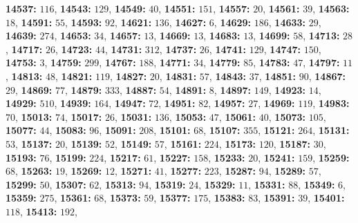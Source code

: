 \textsf{\bfseries 14537:} $116$, \textsf{\bfseries 14543:} $129$, \textsf{\bfseries 14549:} $40$, \textsf{\bfseries 14551:} $151$, \textsf{\bfseries 14557:} $20$, \textsf{\bfseries 14561:} $39$, \textsf{\bfseries 14563:} $18$, \textsf{\bfseries 14591:} $55$, \textsf{\bfseries 14593:} $92$, \textsf{\bfseries 14621:} $136$, \textsf{\bfseries 14627:} $6$, \textsf{\bfseries 14629:} $186$, \textsf{\bfseries 14633:} $29$, \textsf{\bfseries 14639:} $274$, \textsf{\bfseries 14653:} $34$, \textsf{\bfseries 14657:} $13$, \textsf{\bfseries 14669:} $13$, \textsf{\bfseries 14683:} $13$, \textsf{\bfseries 14699:} $58$, \textsf{\bfseries 14713:} $28$, \textsf{\bfseries 14717:} $26$, \textsf{\bfseries 14723:} $44$, \textsf{\bfseries 14731:} $312$, \textsf{\bfseries 14737:} $26$, \textsf{\bfseries 14741:} $129$, \textsf{\bfseries 14747:} $150$, \textsf{\bfseries 14753:} $3$, \textsf{\bfseries 14759:} $299$, \textsf{\bfseries 14767:} $188$, \textsf{\bfseries 14771:} $34$, \textsf{\bfseries 14779:} $85$, \textsf{\bfseries 14783:} $47$, \textsf{\bfseries 14797:} $11$, \textsf{\bfseries 14813:} $48$, \textsf{\bfseries 14821:} $119$, \textsf{\bfseries 14827:} $20$, \textsf{\bfseries 14831:} $57$, \textsf{\bfseries 14843:} $37$, \textsf{\bfseries 14851:} $90$, \textsf{\bfseries 14867:} $29$, \textsf{\bfseries 14869:} $77$, \textsf{\bfseries 14879:} $333$, \textsf{\bfseries 14887:} $54$, \textsf{\bfseries 14891:} $8$, \textsf{\bfseries 14897:} $149$, \textsf{\bfseries 14923:} $14$, \textsf{\bfseries 14929:} $510$, \textsf{\bfseries 14939:} $164$, \textsf{\bfseries 14947:} $72$, \textsf{\bfseries 14951:} $82$, \textsf{\bfseries 14957:} $27$, \textsf{\bfseries 14969:} $119$, \textsf{\bfseries 14983:} $70$, \textsf{\bfseries 15013:} $74$, \textsf{\bfseries 15017:} $26$, \textsf{\bfseries 15031:} $136$, \textsf{\bfseries 15053:} $47$, \textsf{\bfseries 15061:} $40$, \textsf{\bfseries 15073:} $105$, \textsf{\bfseries 15077:} $44$, \textsf{\bfseries 15083:} $96$, \textsf{\bfseries 15091:} $208$, \textsf{\bfseries 15101:} $68$, \textsf{\bfseries 15107:} $355$, \textsf{\bfseries 15121:} $264$, \textsf{\bfseries 15131:} $53$, \textsf{\bfseries 15137:} $20$, \textsf{\bfseries 15139:} $52$, \textsf{\bfseries 15149:} $57$, \textsf{\bfseries 15161:} $224$, \textsf{\bfseries 15173:} $120$, \textsf{\bfseries 15187:} $30$, \textsf{\bfseries 15193:} $76$, \textsf{\bfseries 15199:} $224$, \textsf{\bfseries 15217:} $61$, \textsf{\bfseries 15227:} $158$, \textsf{\bfseries 15233:} $20$, \textsf{\bfseries 15241:} $159$, \textsf{\bfseries 15259:} $68$, \textsf{\bfseries 15263:} $19$, \textsf{\bfseries 15269:} $12$, \textsf{\bfseries 15271:} $41$, \textsf{\bfseries 15277:} $223$, \textsf{\bfseries 15287:} $94$, \textsf{\bfseries 15289:} $57$, \textsf{\bfseries 15299:} $50$, \textsf{\bfseries 15307:} $62$, \textsf{\bfseries 15313:} $94$, \textsf{\bfseries 15319:} $24$, \textsf{\bfseries 15329:} $11$, \textsf{\bfseries 15331:} $88$, \textsf{\bfseries 15349:} $6$, \textsf{\bfseries 15359:} $275$, \textsf{\bfseries 15361:} $68$, \textsf{\bfseries 15373:} $59$, \textsf{\bfseries 15377:} $175$, \textsf{\bfseries 15383:} $83$, \textsf{\bfseries 15391:} $39$, \textsf{\bfseries 15401:} $118$, \textsf{\bfseries 15413:} $192$, 
